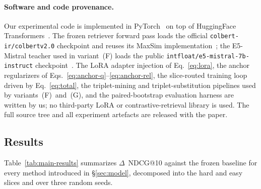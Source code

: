 \paragraph{Software and code provenance.}
Our experimental code is implemented in PyTorch~\cite{paszke2019pytorch} on top of HuggingFace Transformers~\cite{wolf2020transformers}. The frozen retriever forward pass loads the official \texttt{colbert-ir/colbertv2.0} checkpoint and reuses its MaxSim implementation~\cite{santhanam2022colbertv2}; the E5-Mistral teacher used in variant~(F) loads the public \texttt{intfloat/e5-mistral-7b-instruct} checkpoint~\cite{wang2024e5mistral}. The LoRA adapter injection of Eq.~\eqref{eq:lora}, the anchor regularizers of Eqs.~\eqref{eq:anchor-q}--\eqref{eq:anchor-rel}, the slice-routed training loop driven by Eq.~\eqref{eq:total}, the triplet-mining and triplet-substitution pipelines used by variants~(F)~and~(G), and the paired-bootstrap evaluation harness are written by us; no third-party LoRA or contrastive-retrieval library is used. The full source tree and all experiment artefacts are released with the paper.


\subsection{Results}
\label{sec:results}

Table~\ref{tab:main-results} summarizes $\Delta$~NDCG@10 against the frozen baseline for every method introduced in \S\ref{sec:model}, decomposed into the hard and easy slices and over three random seeds.

